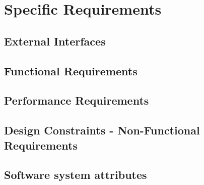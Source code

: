 \section{Specific Requirements}

\subsection{External Interfaces}


\clearpage

\subsection{Functional Requirements}


\subsection{Performance Requirements}


\subsection{Design Constraints - Non-Functional Requirements}


\subsection{Software system attributes}

